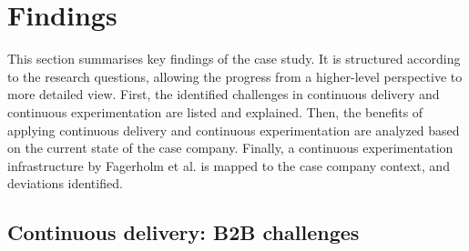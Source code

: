 \documentclass[english]{tktltiki2}
\theoremstyle{definition}
\theoremstyle{remark}
\begin{document}



\section{Findings}
This section summarises key findings of the case study. It is structured according to the research questions, allowing the progress from a higher-level perspective to more detailed view. First, the identified challenges in continuous delivery and continuous experimentation are listed and explained. Then, the benefits of applying continuous delivery and continuous experimentation are analyzed based on the current state of the case company. Finally, a continuous experimentation infrastructure by Fagerholm et al. \cite{fagerholm2014building} is mapped to the case company context, and deviations identified.


%




\subsection{Continuous delivery: B2B challenges}
\end{document}
